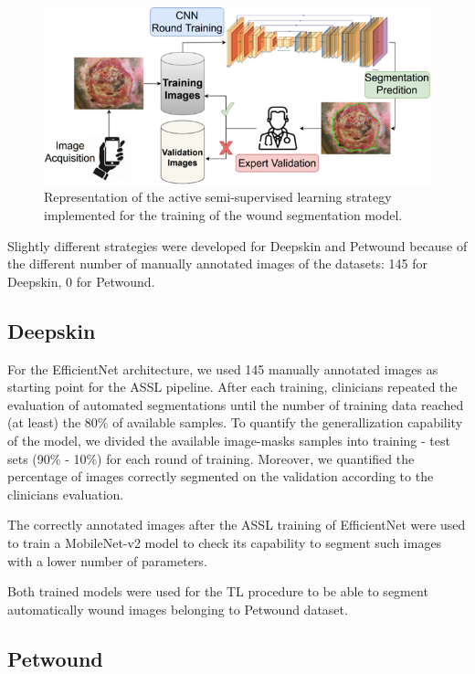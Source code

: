 \documentclass[../main.tex]{subfiles}
\begin{document}
\begin{figure}[H] 
\begin{center}
\includegraphics[width=16cm]{images/ASSL.png}
\caption{\small{Representation of the active semi-supervised learning strategy implemented for the training of the wound segmentation model.}}\label{fig:ASSL}
\end{center}
\end{figure}

Slightly different strategies were developed for Deepskin and Petwound because of the different number of manually annotated images of the datasets: 145 for Deepskin, 0 for Petwound.

\subsection{Deepskin}

For the EfficientNet architecture, we used 145 manually annotated images as starting point for the ASSL pipeline.
After each training, clinicians repeated the evaluation of automated segmentations until the number of training data reached (at least) the 80\% of available samples.
To quantify the generallization capability of the model, we divided the available image-masks samples into training - test sets (90\% - 10\%) for each round of training.
Moreover, we quantified the percentage of images correctly segmented on the validation according to the clinicians evaluation.

The correctly annotated images after the ASSL training of EfficientNet were used to train a MobileNet-v2 model  to check its capability to segment such images with a lower number of parameters.

Both trained models were used for the TL procedure to be able to segment automatically wound images belonging to Petwound dataset.

\subsection{Petwound}
\end{document}

